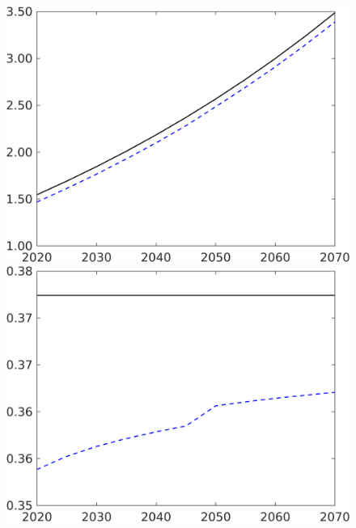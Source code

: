 \begin{figure}[h!!]
\begin{minipage}[]{0.32\textwidth}
	\end{minipage}
	\begin{minipage}[]{0.32\textwidth}
		\includegraphics[width=1\textwidth]{../../codding_model/own_basedOnFried/optimalPol_190722_tidiedUp/figures/all_10Aout22/CountTaul_modnsk_target_C_spillover0_sep1_extern0_PV1_etaa0.79_lgd0.png}
	\end{minipage}
	\begin{minipage}[]{0.32\textwidth}
		\includegraphics[width=1\textwidth]{../../codding_model/own_basedOnFried/optimalPol_190722_tidiedUp/figures/all_10Aout22/CountTaul_modnsk_target_hl_spillover0_sep1_extern0_PV1_etaa0.79_lgd0.png}

\end{minipage}
\end{figure}
